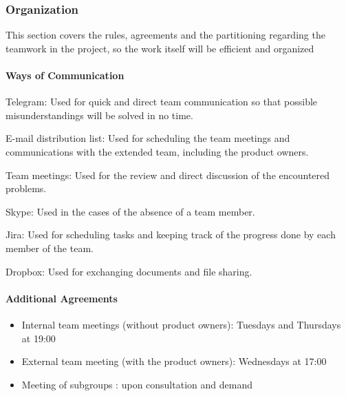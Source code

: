 \newpage

\subsubsection{Organization}

This section covers the rules, agreements and the partitioning regarding the teamwork in the project, so the work itself will be efficient and organized

\paragraph{Ways of Communication}
\begin{aims}
	\item[Telegram:] Used for quick and direct team communication so that possible misunderstandings will be solved in no time.
	
	\item[E-mail distribution list:] Used for scheduling the team meetings and communications with the extended team, including the product owners. 
	
	\item[Team meetings:] Used for the review and direct discussion of the encountered problems. 
	
	\item[Skype:] Used in the cases of the absence of a team member. 
	
	\item[Jira:] Used for scheduling tasks and keeping track of the progress done by each member of the team.
	
	\item[Dropbox:] Used for exchanging documents and file sharing.  
\end{aims}

\paragraph{Additional Agreements}
\begin{itemize}
	\item Internal team meetings (without product owners): Tuesdays and Thursdays at 19:00
	
	\item External team meeting (with the product owners): Wednesdays at 17:00
	
	\item Meeting of subgroups : upon consultation and demand 
\end{itemize}

